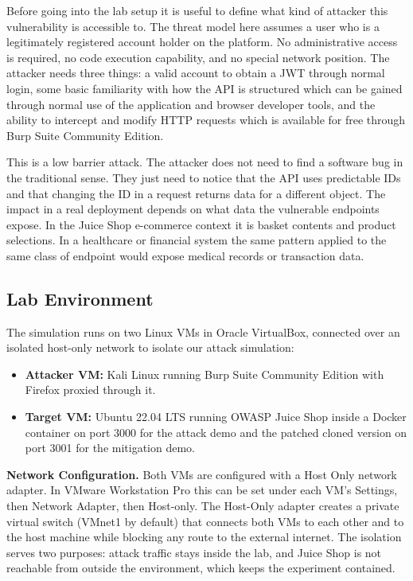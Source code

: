 \documentclass[12pt]{IEEEtran}
\begin{document}
Before going into the lab setup it is useful to define what kind of attacker this vulnerability is accessible to. The threat model here assumes a user who is a legitimately registered account holder on the platform. No administrative access is required, no code execution capability, and no special network position. The attacker needs three things: a valid account to obtain a JWT through normal login, some basic familiarity with how the API is structured which can be gained through normal use of the application and browser developer tools, and the ability to intercept and modify HTTP requests which is available for free through Burp Suite Community Edition.

This is a low barrier attack. The attacker does not need to find a software bug in the traditional sense. They just need to notice that the API uses predictable IDs and that changing the ID in a request returns data for a different object. The impact in a real deployment depends on what data the vulnerable endpoints expose. In the Juice Shop e-commerce context it is basket contents and product selections. In a healthcare or financial system the same pattern applied to the same class of endpoint would expose medical records or transaction data.

\subsection{Lab Environment}

The simulation runs on two Linux VMs in Oracle VirtualBox, connected over an isolated host-only network to isolate our attack simulation:

\begin{itemize}
  \item \textbf{Attacker VM:} Kali Linux running Burp Suite Community Edition with Firefox proxied through it.
  \item \textbf{Target VM:} Ubuntu 22.04 LTS running OWASP Juice Shop inside a Docker container on port 3000 for the attack demo and the patched cloned version on port 3001 for the mitigation demo.
\end{itemize}

\textbf{Network Configuration.} Both VMs are configured with a Host Only network adapter. In VMware Workstation Pro this can be set under each VM's Settings, then Network Adapter, then Host-only. The Host-Only adapter creates a private virtual switch (VMnet1 by default) that connects both VMs to each other and to the host machine while blocking any route to the external internet. The isolation serves two purposes: attack traffic stays inside the lab, and Juice Shop is not reachable from outside the environment, which keeps the experiment contained.
\end{document}
